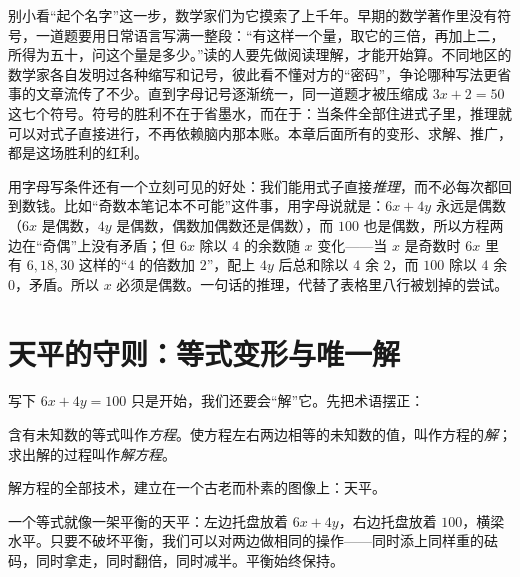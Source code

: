 别小看“起个名字”这一步，数学家们为它摸索了上千年。早期的数学著作里没有符号，一道题要用日常语言写满一整段：“有这样一个量，取它的三倍，再加上二，所得为五十，问这个量是多少。”读的人要先做阅读理解，才能开始算。不同地区的数学家各自发明过各种缩写和记号，彼此看不懂对方的“密码”，争论哪种写法更省事的文章流传了不少。直到字母记号逐渐统一，同一道题才被压缩成 $3x+2=50$ 这七个符号。符号的胜利不在于省墨水，而在于：当条件全部住进式子里，推理就可以对式子直接进行，不再依赖脑内那本账。本章后面所有的变形、求解、推广，都是这场胜利的红利。

用字母写条件还有一个立刻可见的好处：我们能用式子直接\emph{推理}，而不必每次都回到数钱。比如“奇数本笔记本不可能”这件事，用字母说就是：$6x+4y$ 永远是偶数（$6x$ 是偶数，$4y$ 是偶数，偶数加偶数还是偶数），而 $100$ 也是偶数，所以方程两边在“奇偶”上没有矛盾；但 $6x$ 除以 $4$ 的余数随 $x$ 变化——当 $x$ 是奇数时 $6x$ 里有 $6,18,30$ 这样的“$4$ 的倍数加 $2$”，配上 $4y$ 后总和除以 $4$ 余 $2$，而 $100$ 除以 $4$ 余 $0$，矛盾。所以 $x$ 必须是偶数。一句话的推理，代替了表格里八行被划掉的尝试。

\section{天平的守则：等式变形与唯一解}

写下 $6x+4y=100$ 只是开始，我们还要会“解”它。先把术语摆正：

\begin{dingyi}[方程]
含有未知数的等式叫作\emph{方程}。使方程左右两边相等的未知数的值，叫作方程的\emph{解}；求出解的过程叫作\emph{解方程}。
\end{dingyi}

解方程的全部技术，建立在一个古老而朴素的图像上：天平。

一个等式就像一架平衡的天平：左边托盘放着 $6x+4y$，右边托盘放着 $100$，横梁水平。只要不破坏平衡，我们可以对两边做相同的操作——同时添上同样重的砝码，同时拿走，同时翻倍，同时减半。平衡始终保持。

\begin{center}
\end{center}

